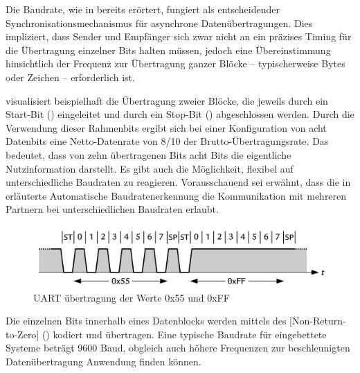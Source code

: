 Die Baudrate, wie in  bereits er\"ortert, fungiert als entscheidender Synchronisationsmechanismus f\"ur asynchrone Daten\"ubertragungen. Dies impliziert, dass Sender und Empf\"anger sich zwar nicht an ein pr\"azises Timing f\"ur die \"Ubertragung einzelner Bits halten m\"ussen, jedoch eine \"Ubereinstimmung hinsichtlich der Frequenz zur \"Ubertragung ganzer Bl\"ocke -- typischerweise Bytes oder Zeichen -- erforderlich ist. 

 visualisiert beispielhaft die \"Ubertragung zweier Bl\"ocke, die jeweils durch ein Start-Bit () eingeleitet und durch ein Stop-Bit () abgeschlossen werden. Durch die Verwendung dieser Rahmenbits ergibt sich bei einer Konfiguration von acht Datenbits eine Netto-Datenrate von 8/10 der Brutto-\"Ubertragungsrate. Das bedeutet, dass von zehn \"ubertragenen Bits acht Bits die eigentliche Nutzinformation darstellt. Es gibt auch die M\"oglichkeit, flexibel auf unterschiedliche Baudraten zu reagieren. Vorausschauend sei erw\"ahnt, dass die in  erl\"auterte Automatische Baudratenerkennung die Kommunikation mit mehreren Partnern bei unterschiedlichen Baudraten erlaubt. 

\vspace{1cm}
\begin{figure}[h!]
	\centering
	\includegraphics[width=1.0\textwidth]{../Bilder/Baudrate.png}
	\caption{UART \"ubertragung der Werte 0x55 und 0xFF\\}
	\label{fig:uart_send}
\end{figure}

\newpage
Die einzelnen Bits innerhalb eines Datenblocks werden mittels des [Non-Return-to-Zero] () kodiert und \"ubertragen. Eine typische Baudrate f\"ur eingebettete Systeme betr\"agt 9600 Baud, obgleich auch h\"ohere Frequenzen zur beschleunigten Daten\"ubertragung Anwendung finden k\"onnen. 

